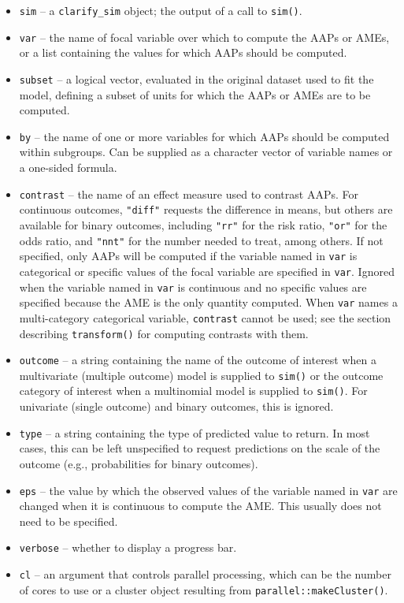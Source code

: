 \begin{itemize}
\item
  \texttt{sim} -- a \texttt{clarify\_sim} object; the output of a call to \texttt{sim()}.
\item
  \texttt{var} -- the name of focal variable over which to compute the AAPs or AMEs, or a list containing the values for which AAPs should be computed.
\item
  \texttt{subset} -- a logical vector, evaluated in the original dataset used to fit the model, defining a subset of units for which the AAPs or AMEs are to be computed.
\item
  \texttt{by} -- the name of one or more variables for which AAPs should be computed within subgroups. Can be supplied as a character vector of variable names or a one-sided formula.
\item
  \texttt{contrast} -- the name of an effect measure used to contrast AAPs. For continuous outcomes, \texttt{"diff"} requests the difference in means, but others are available for binary outcomes, including \texttt{"rr"} for the risk ratio, \texttt{"or"} for the odds ratio, and \texttt{"nnt"} for the number needed to treat, among others. If not specified, only AAPs will be computed if the variable named in \texttt{var} is categorical or specific values of the focal variable are specified in \texttt{var}. Ignored when the variable named in \texttt{var} is continuous and no specific values are specified because the AME is the only quantity computed. When \texttt{var} names a multi-category categorical variable, \texttt{contrast} cannot be used; see the section describing \texttt{transform()} for computing contrasts with them.
\item
  \texttt{outcome} -- a string containing the name of the outcome of interest when a multivariate (multiple outcome) model is supplied to \texttt{sim()} or the outcome category of interest when a multinomial model is supplied to \texttt{sim()}. For univariate (single outcome) and binary outcomes, this is ignored.
\item
  \texttt{type} -- a string containing the type of predicted value to return. In most cases, this can be left unspecified to request predictions on the scale of the outcome (e.g., probabilities for binary outcomes).
\item
  \texttt{eps} -- the value by which the observed values of the variable named in \texttt{var} are changed when it is continuous to compute the AME. This usually does not need to be specified.
\item
  \texttt{verbose} -- whether to display a progress bar.
\item
  \texttt{cl} -- an argument that controls parallel processing, which can be the number of cores to use or a cluster object resulting from \texttt{parallel::makeCluster()}.
\end{itemize}


